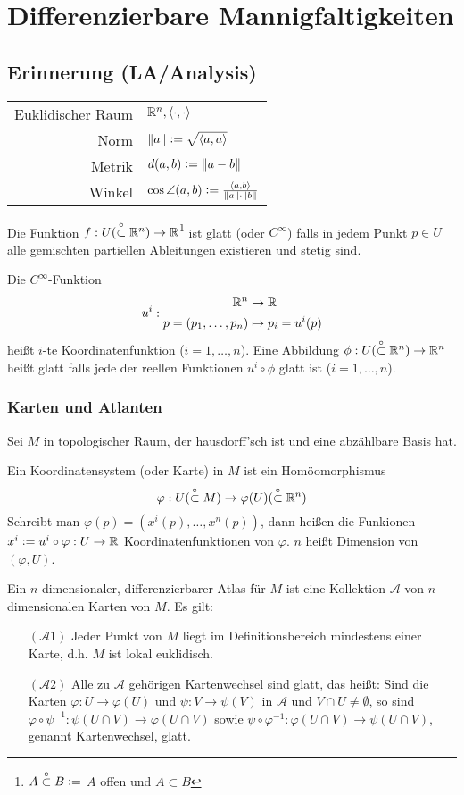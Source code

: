 \documentclass[a4paper,twoside,DIV15,BCOR12mm]{scrbook}
\newcommand{\otm}{\stackrel{\circ}{\subset}} %
\newcommand{\At}{\mathcal A}
\renewcommand{\da}{\mathrel{\DOTSB\mathop:}=}
\begin{document}
\section{Differenzierbare Mannigfaltigkeiten}

\subsection*{Erinnerung (LA/Analysis)}
\begin{tabular}{rl}
Euklidischer Raum & $\mathbb{R}^n, \langle\cdot,\cdot\rangle$ \\
Norm & $ \|a\| \da  \sqrt{\langle a, a\rangle} $ \\
Metrik & $d(a,b) \da  \| a-b\| $ \\
Winkel & $\cos \angle(a,b) \da  \frac{\langle a, b\rangle}{\|a\|\cdot\|b\|} $ 
\end{tabular}

Die Funktion $f:U (\otm \MdR^n) \to \MdR$\footnote{$A\otm B \da  $ $A$ offen und $A\subset B$} ist glatt (oder $C^\infty$) falls in jedem Punkt $p\in U$ alle gemischten partiellen Ableitungen existieren und stetig sind.

Die $C^\infty$-Funktion
\[ u^i:
\begin{aligned}
\mathbb{R}^n &\to \mathbb{R} \\
p = (p_1,\ldots,p_n) &\mapsto p_i =u^i(p)
\end{aligned}
\]
heißt $i$-te Koordinatenfunktion ($i=1,\ldots,n$). Eine Abbildung $\phi: U(\otm \MdR^n)\to \MdR^n$ heißt glatt falls jede der reellen Funktionen $u^i\circ\phi$ glatt ist ($i=1,\ldots,n$).

\subsubsection*{Karten und Atlanten}
Sei $M$ in topologischer Raum, der hausdorff’sch ist und eine abzählbare Basis hat.

Ein Koordinatensystem (oder Karte) in $M$ ist ein Homöomorphismus
\[\varphi: U(\otm M) \to \varphi(U) (\otm\MdR^n) \]
Schreibt man $\varphi(p) = (x^i(p),\ldots,x^n(p))$, dann heißen die Funkionen $x^i \da  u^i\circ \varphi : U \to \MdR$ Koordinatenfunktionen von $\varphi$. $n$ heißt Dimension von $(\varphi,U)$.

Ein $n$-dimensionaler, differenzierbarer Atlas für $M$ ist eine Kollektion $\At$ von $n$-dimensionalen Karten von $M$. Es gilt:
\begin{itemize}
\item[$(\At1)$] Jeder Punkt von $M$ liegt im Definitionsbereich mindestens einer Karte, d.h. $M$ ist lokal euklidisch.
\item[$(\At2)$] Alle zu $\At$ gehörigen Kartenwechsel sind glatt, das heißt: Sind die Karten $\varphi: U\to \varphi(U)$ und $\psi:V\to\psi(V)$ in $\At$ und $V\cap U \ne \emptyset$, so sind $\varphi \circ \psi^{-1}: \psi(U\cap V) \to \varphi(U\cap V)$ sowie $\psi \circ \varphi^{-1}: \varphi(U\cap V) \to \psi(U \cap V)$, genannt Kartenwechsel, glatt.
\end{itemize}
\end{document}

